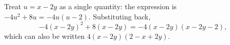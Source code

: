 Treat $u=x-2y$ as a single quantity: the expression is $-4u^2+8u=-4u(u-2)$. Substituting back,
\[-4(x-2y)^2+8(x-2y)=\boxed{-4(x-2y)(x-2y-2)},\]
which can also be written $4(x-2y)(2-x+2y)$.
